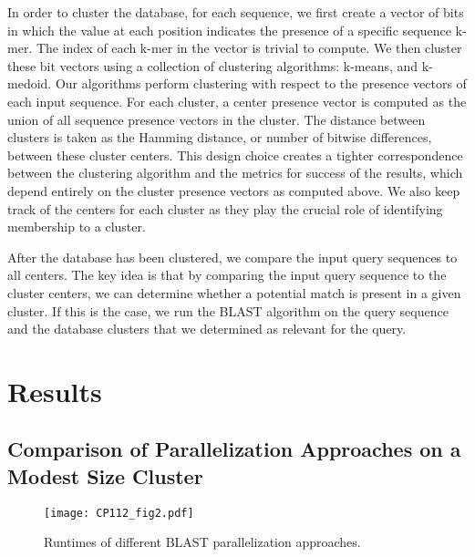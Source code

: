 In order to cluster the database, for each sequence, we first create a vector of bits in which the value at each position indicates the presence of a specific sequence k-mer. The index of each k-mer in the vector is trivial to compute.
We then cluster these bit vectors using a collection of clustering algorithms: k-means\cite{hartigan1979algorithm}, and k-medoid\cite{van2003new}.
Our algorithms perform clustering with respect to the presence vectors of each input sequence. For each cluster, a center presence vector is computed as the union of all sequence presence vectors in the cluster. The distance between clusters is taken as the Hamming distance, or number of bitwise differences, between these cluster centers. This design choice creates a tighter correspondence between the clustering algorithm and the metrics for success of the results, which depend entirely on the cluster presence vectors as computed above.
We also keep track of the centers for each cluster as they play the crucial role of identifying membership to a cluster.

After the database has been clustered, we compare the input query sequences to all centers. The key idea is that by comparing the input query sequence to the cluster centers, we can determine whether a potential match is present in a given cluster. If this is the case, we run the BLAST algorithm on the query sequence and the database clusters that we determined as relevant for the query.


%
\section{Results}

\subsection{Comparison of Parallelization Approaches on a Modest Size Cluster}

\begin{figure}[!htb]%
\begin{center}
\texttt{[image: CP112\_fig2.pdf]}
\end{center}
\renewcommand{\baselinestretch}{1}
\small\normalsize
\begin{quote}
\caption{Runtimes of different BLAST parallelization approaches.}
\label{fig:parallel_approaches}
\end{quote}
\end{figure}
\renewcommand{\baselinestretch}{2}
\small\normalsize


